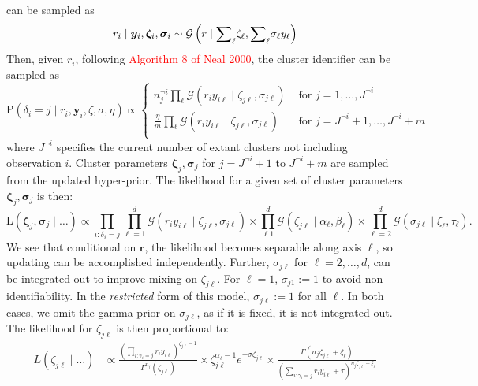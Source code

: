 \documentclass[10pt]{article}
\newcommand{\makenote}[1]{\textcolor{red}{#1}} %
\begin{document}
    can be sampled as
\begin{equation*}
    r_i \mid \bm{y}_i,\bm{\zeta}_i,\bm{\sigma}_i\sim 
        \mathcal{G}\left(r\mid{\small \sum}_{\ell}\zeta_\ell,{\small\sum}_{\ell} \sigma_{\ell}y_{\ell}\right)
\end{equation*}
Then, given $r_i$, following \makenote{Algorithm 8 of Neal 2000}, the cluster identifier can
    be sampled as
\begin{equation*}
    \text{P}(\delta_i = j \mid r_i, \bm{y}_i, \zeta, \sigma, \eta) \propto \begin{cases}
    n_j^{\neg i}\prod_{\ell}\mathcal{G}\left(r_i y_{i\ell}\mid\zeta_{j\ell},\sigma_{j\ell}\right) 
        &\text{ for }j = 1,\ldots, J^{\neg i} \\
    \frac{\eta}{m}\prod_{\ell}\mathcal{G}\left(r_i y_{i\ell}\mid\zeta_{j\ell},\sigma_{j\ell}\right) 
        &\text{ for }j = J^{\neg i} + 1,\ldots, J^{\neg i} + m\\
    \end{cases}
\end{equation*}
where $J^{\neg i}$ specifies the current number of extant clusters not including observation $i$.  Cluster
    parameters $\bm{\zeta}_j,\bm{\sigma}_j$ for $j = J^{\neg i} + 1$ to $J^{\neg i} + m$ are sampled from
    the updated hyper-prior.  The likelihood for a given set of cluster parameters 
    $\bm{\zeta}_j,\bm{\sigma}_j$ is then:
\begin{equation*}
    \text{L}\left(\bm{\zeta}_j,\bm{\sigma}_j\mid\ldots\right) \propto 
        \prod_{i:\delta_i = j}\prod_{\ell = 1}^d
        \mathcal{G}\left(r_i y_{i\ell}\mid\zeta_{j\ell},\sigma_{j\ell}\right)
        \times \prod_{\ell  1}^d\mathcal{G}\left(\zeta_{j\ell}\mid \alpha_{\ell},\beta_{\ell}\right)
        \times\prod_{\ell = 2}^d\mathcal{G}\left(\sigma_{j\ell}\mid\xi_{\ell},\tau_{\ell}\right).
\end{equation*}
We see that conditional on $\bm{r}$, the likelihood becomes separable along axis $\ell$, so updating can
    be accomplished independently.  Further, $\sigma_{j\ell}$ for $\ell = 2,\ldots, d$, can be integrated 
    out to improve mixing on $\zeta_{j\ell}$. For $\ell = 1$, $\sigma_{j1} := 1$ to avoid non-identifiability.
    In the \emph{restricted} form of this model, $\sigma_{j\ell} := 1$ for all $\ell$.  In both cases, we 
    omit the gamma prior on $\sigma_{j\ell}$, as if it is fixed, it is not integrated out.  The likelihood 
    for $\zeta_{j\ell}$ is then proportional to:
\begin{equation*}
    \begin{aligned}
    L(\zeta_{j\ell}\mid\ldots) &\propto \frac{\left(\prod_{i:\gamma_i = j}r_i y_{i\ell}\right)^{\zeta_{j\ell} - 1}}{\Gamma^{n_j}(\zeta_{j\ell})}\times \zeta_{j\ell}^{\alpha_{\ell} - 1}e^{-\sigma\zeta_{j\ell}}\times\frac{\Gamma(n_j\zeta_{j\ell} + \xi_{\ell})}{\left(\sum_{i:\gamma_i = j}r_iy_{i\ell} + \tau\right)^{n_j\zeta_{j\ell} + \xi_{\ell}}}
    \end{aligned}
\end{equation*}
\end{document}
